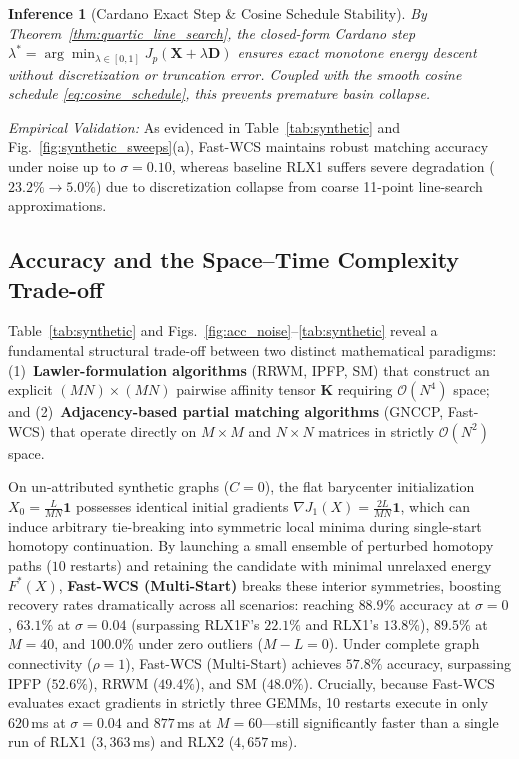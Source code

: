 \documentclass[conference]{IEEEtran}
\newtheorem{inference}{Inference}
\begin{document}
\begin{inference}[Cardano Exact Step \& Cosine Schedule Stability]
\label{inf:cardano_synthetic}
By Theorem~\ref{thm:quartic_line_search}, the closed-form Cardano step $\lambda^* = \arg\min_{\lambda \in [0, 1]} J_p(\mathbf{X} + \lambda \mathbf{D})$ ensures exact monotone energy descent without discretization or truncation error. Coupled with the smooth cosine schedule \eqref{eq:cosine_schedule}, this prevents premature basin collapse.
\end{inference}
\textit{Empirical Validation:} As evidenced in Table~\ref{tab:synthetic} and Fig.~\ref{fig:synthetic_sweeps}(a), Fast-WCS maintains robust matching accuracy under noise up to $\sigma=0.10$, whereas baseline RLX1 suffers severe degradation ($23.2\% \to 5.0\%$) due to discretization collapse from coarse 11-point line-search approximations.






\subsection{Accuracy and the Space--Time Complexity Trade-off}
\label{subsec:tradeoff}



Table~\ref{tab:synthetic} and Figs.~\ref{fig:acc_noise}--\ref{tab:synthetic} reveal a fundamental structural trade-off between two distinct mathematical paradigms: (1)~\textbf{Lawler-formulation algorithms} (RRWM, IPFP, SM) that construct an explicit $(MN) \times (MN)$ pairwise affinity tensor $\mathbf{K}$ requiring $\mathcal{O}(N^4)$ space; and (2)~\textbf{Adjacency-based partial matching algorithms} (GNCCP, Fast-WCS) that operate directly on $M \times M$ and $N \times N$ matrices in strictly $\mathcal{O}(N^2)$ space.

On un-attributed synthetic graphs ($C=0$), the flat barycenter initialization $X_0 = \frac{L}{MN}\mathbf{1}$ possesses identical initial gradients $\nabla J_1(X) = \frac{2L}{MN}\mathbf{1}$, which can induce arbitrary tie-breaking into symmetric local minima during single-start homotopy continuation. By launching a small ensemble of perturbed homotopy paths ($10$ restarts) and retaining the candidate with minimal unrelaxed energy $F^*(X)$, \textbf{Fast-WCS (Multi-Start)} breaks these interior symmetries, boosting recovery rates dramatically across all scenarios: reaching $\mathbf{88.9\%}$ accuracy at $\sigma=0$, $\mathbf{63.1\%}$ at $\sigma=0.04$ (surpassing RLX1F's $22.1\%$ and RLX1's $13.8\%$), $\mathbf{89.5\%}$ at $M=40$, and $\mathbf{100.0\%}$ under zero outliers ($M-L=0$). Under complete graph connectivity ($\rho=1$), Fast-WCS (Multi-Start) achieves $\mathbf{57.8\%}$ accuracy, surpassing IPFP ($52.6\%$), RRWM ($49.4\%$), and SM ($48.0\%$). Crucially, because Fast-WCS evaluates exact gradients in strictly three GEMMs, 10 restarts execute in only $620$\,ms at $\sigma=0.04$ and $877$\,ms at $M=60$—still significantly faster than a single run of RLX1 ($3{,}363$\,ms) and RLX2 ($4{,}657$\,ms).
\end{document}

